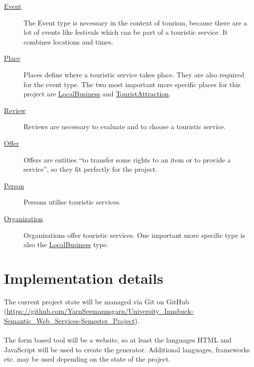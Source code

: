 \documentclass[paper=a4, fontsize=12pt]{scrartcl} %
\numberwithin{equation}{section} %
\numberwithin{figure}{section} %
\numberwithin{table}{section} %
\begin{document}
\begin{description}
\item[\href{https://schema.org/Event}{Event}] The Event type is necessary in the context of tourism, because there are a lot of events like festivals which can be part of a touristic service. It combines locations and times.
\item[\href{https://schema.org/Place}{Place}] Places define where a touristic service takes place. They are also required for the event type. The two most important more specific places for this project are \href{https://schema.org/LocalBusiness}{LocalBusiness} and \href{https://schema.org/TouristAttraction}{TouristAttraction}.
\item[\href{https://schema.org/Review}{Review}] Reviews are necessary to evaluate and to choose a touristic service.
\item[\href{https://schema.org/Offer}{Offer}] Offers are entities ``to transfer some rights to an item or to provide a service'', so they fit perfectly for the project.
\item[\href{https://schema.org/Person}{Person}] Persons utilise touristic services.
\item[\href{https://schema.org/Organization}{Organization}] Organizations offer touristic services. One important more specific type is also the \href{https://schema.org/LocalBusiness}{LocalBusiness} type.
\end{description}


\section{Implementation details}
\label{sec:implementation_details}

The current project state will be managed via Git on GitHub (\href{https://github.com/YarnSeemannsgarn/University_Innsbuck-Semantic_Web_Services-Semester_Project}{https://\allowbreak{}github.\allowbreak{}com/\allowbreak{}YarnSeemannsgarn/\allowbreak{}University\_Innsbuck-\allowbreak{}Semantic\_Web\_Services-\allowbreak{}Semester\_Project}).\\
\\
The form based tool will be a website, so at least the languages HTML and JavaScript will be used to create the generator. Additional languages, frameworks etc. may be used depending on the state of the project.


\end{document}
